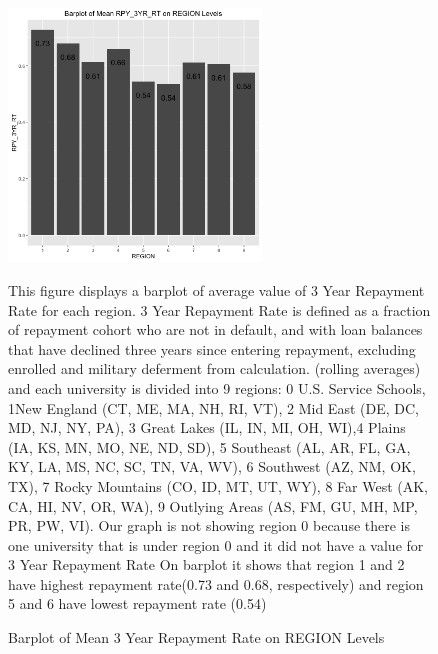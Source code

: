 \begin{figure}
  \caption{Barplot of Mean 3 Year Repayment Rate on REGION Levels}
  \centering
  \includegraphics[width=0.6\textwidth]{../images/eda/rpy_region_barplot.png}
  \centering
  \newline
  
  \raggedright
This figure displays a barplot of average value of 3 Year Repayment Rate for each region. 3 Year Repayment Rate is defined as a fraction of repayment cohort who are not in default, and with loan balances that have declined three years since entering repayment, excluding enrolled and military deferment from calculation. (rolling averages) and each university is divided into 9 regions: 0	U.S. Service Schools, 1New England (CT, ME, MA, NH, RI, VT), 2	Mid East (DE, DC, MD, NJ, NY, PA), 3	Great Lakes (IL, IN, MI, OH, WI),4	Plains (IA, KS, MN, MO, NE, ND, SD), 5	Southeast (AL, AR, FL, GA, KY, LA, MS, NC, SC, TN, VA, WV), 6	Southwest (AZ, NM, OK, TX), 7	Rocky Mountains (CO, ID, MT, UT, WY), 8	Far West (AK, CA, HI, NV, OR, WA), 9	Outlying Areas (AS, FM, GU, MH, MP, PR, PW, VI). Our graph is not showing region 0 because there is one university that is under region 0 and it did not have a value for 3 Year Repayment Rate On barplot it shows that region 1 and 2 have highest repayment rate(0.73 and 0.68, respectively) and region 5 and 6 have lowest repayment rate (0.54)
\end{figure}


